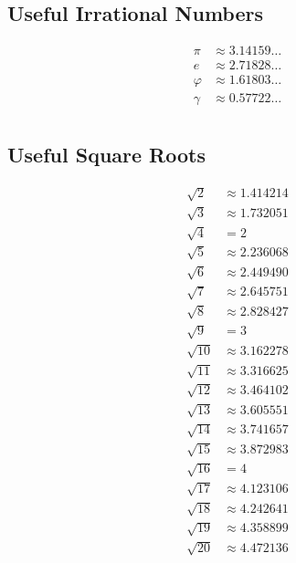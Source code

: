 \documentclass[12pt]{article}
\begin{document}
\newpage

\subsection*{Useful Irrational Numbers}
\begin{align*}
     \pi & \approx 3.14159 \ldots \\
       e & \approx 2.71828 \ldots \\
 \varphi & \approx 1.61803 \ldots \\
  \gamma & \approx 0.57722 \ldots \\
\end{align*}

\subsection*{Useful Square Roots}
\begin{align*}
 \sqrt{2} & \approx 1.414214 \\
 \sqrt{3} & \approx 1.732051 \\
 \sqrt{4} & = 2\\
 \sqrt{5} & \approx 2.236068 \\
 \sqrt{6} & \approx 2.449490 \\
 \sqrt{7} & \approx 2.645751 \\
 \sqrt{8} & \approx 2.828427 \\
 \sqrt{9} & = 3\\
\sqrt{10} & \approx 3.162278 \\
\sqrt{11} & \approx 3.316625 \\
\sqrt{12} & \approx 3.464102 \\
\sqrt{13} & \approx 3.605551 \\
\sqrt{14} & \approx 3.741657 \\
\sqrt{15} & \approx 3.872983 \\
\sqrt{16} & = 4\\
\sqrt{17} & \approx 4.123106 \\
\sqrt{18} & \approx 4.242641 \\
\sqrt{19} & \approx 4.358899 \\
\sqrt{20} & \approx 4.472136 \\
\end{align*}
\end{document}

